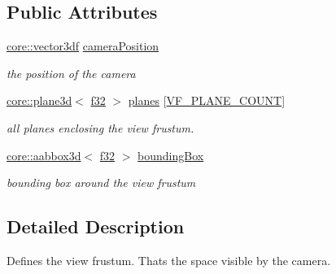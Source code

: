 \subsection*{Public Attributes}
\begin{DoxyCompactItemize}
\item 
\mbox{\label{structirr_1_1scene_1_1SViewFrustum_a77726fa084f416d69f058a7b2f887545}} 
\hyperlink{namespaceirr_1_1core_ae6e2b2a6c552833ebbd5b7463d03586b}{core\+::vector3df} \hyperlink{structirr_1_1scene_1_1SViewFrustum_a77726fa084f416d69f058a7b2f887545}{camera\+Position}
\begin{DoxyCompactList}\small\item\em the position of the camera \end{DoxyCompactList}\item 
\mbox{\label{structirr_1_1scene_1_1SViewFrustum_adab525201a382d1e43c6c29cf32c1c2c}} 
\hyperlink{classirr_1_1core_1_1plane3d}{core\+::plane3d}$<$ \hyperlink{namespaceirr_a0277be98d67dc26ff93b1a6a1d086b07}{f32} $>$ \hyperlink{structirr_1_1scene_1_1SViewFrustum_adab525201a382d1e43c6c29cf32c1c2c}{planes} \mbox{[}\hyperlink{structirr_1_1scene_1_1SViewFrustum_ae3a96797aec028717f0589e82926b9f0aa5eedad81f8586cd580eced0c7e33eed}{V\+F\+\_\+\+P\+L\+A\+N\+E\+\_\+\+C\+O\+U\+NT}\mbox{]}
\begin{DoxyCompactList}\small\item\em all planes enclosing the view frustum. \end{DoxyCompactList}\item 
\mbox{\label{structirr_1_1scene_1_1SViewFrustum_a32f0e146026122b6a3a40b8846275dc7}} 
\hyperlink{classirr_1_1core_1_1aabbox3d}{core\+::aabbox3d}$<$ \hyperlink{namespaceirr_a0277be98d67dc26ff93b1a6a1d086b07}{f32} $>$ \hyperlink{structirr_1_1scene_1_1SViewFrustum_a32f0e146026122b6a3a40b8846275dc7}{bounding\+Box}
\begin{DoxyCompactList}\small\item\em bounding box around the view frustum \end{DoxyCompactList}\end{DoxyCompactItemize}


\subsection{Detailed Description}
Defines the view frustum. That\textquotesingle{}s the space visible by the camera. 

